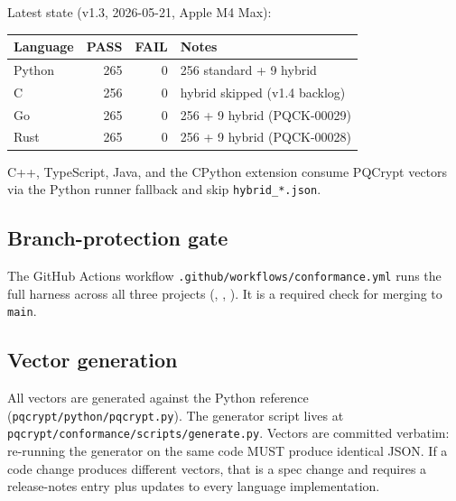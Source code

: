 Latest state (v1.3, 2026-05-21, Apple M4 Max):

\begin{center}
\small
\begin{tabular}{@{}lrrl@{}}
\toprule
\textbf{Language} & \textbf{PASS} & \textbf{FAIL} & \textbf{Notes} \\
\midrule
Python   & 265 & 0 & 256 standard + 9 hybrid \\
C        & 256 & 0 & hybrid skipped (v1.4 backlog) \\
Go       & 265 & 0 & 256 + 9 hybrid (PQCK-00029) \\
Rust     & 265 & 0 & 256 + 9 hybrid (PQCK-00028) \\
\bottomrule
\end{tabular}
\end{center}

C++, TypeScript, Java, and the CPython extension consume PQCrypt vectors via the Python runner fallback and skip \texttt{hybrid\_*.json}.

\subsection{Branch-protection gate}

The GitHub Actions workflow \texttt{.github/workflows/conformance.yml} runs the full harness across all three projects (\pqid, \pqhash, \pqcrypt). It is a required check for merging to \texttt{main}.

\subsection{Vector generation}

All vectors are generated against the Python reference (\texttt{pqcrypt/python/pqcrypt.py}). The generator script lives at \texttt{pqcrypt/conformance/scripts/generate.py}. Vectors are committed verbatim: re-running the generator on the same code MUST produce identical JSON. If a code change produces different vectors, that is a spec change and requires a release-notes entry plus updates to every language implementation.
